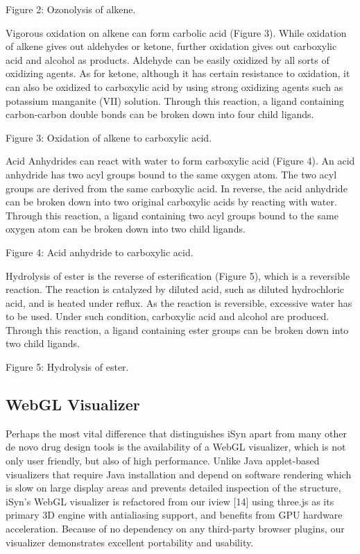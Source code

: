 Figure 2: Ozonolysis of alkene.

Vigorous oxidation on alkene can form carbolic acid (Figure 3). While oxidation of alkene gives out aldehydes or ketone, further oxidation gives out carboxylic acid and alcohol as products. Aldehyde can be easily oxidized by all sorts of oxidizing agents. As for ketone, although it has certain resistance to oxidation, it can also be oxidized to carboxylic acid by using strong oxidizing agents such as potassium manganite (VII) solution. Through this reaction, a ligand containing carbon-carbon double bonds can be broken down into four child ligands.
 
Figure 3: Oxidation of alkene to carboxylic acid.

Acid Anhydrides can react with water to form carboxylic acid (Figure 4). An acid anhydride has two acyl groups bound to the same oxygen atom. The two acyl groups are derived from the same carboxylic acid. In reverse, the acid anhydride can be broken down into two original carboxylic acids by reacting with water. Through this reaction, a ligand containing two acyl groups bound to the same oxygen atom can be broken down into two child ligands.
 
Figure 4: Acid anhydride to carboxylic acid.

Hydrolysis of ester is the reverse of esterification (Figure 5), which is a reversible reaction. The reaction is catalyzed by diluted acid, such as diluted hydrochloric acid, and is heated under reflux. As the reaction is reversible, excessive water has to be used. Under such condition, carboxylic acid and alcohol are produced. Through this reaction, a ligand containing ester groups can be broken down into two child ligands.

Figure 5: Hydrolysis of ester.

\subsection{WebGL Visualizer}

Perhaps the most vital difference that distinguishes iSyn apart from many other de novo drug design tools is the availability of a WebGL visualizer, which is not only user friendly, but also of high performance. Unlike Java applet-based visualizers that require Java installation and depend on software rendering which is slow on large display areas and prevents detailed inspection of the structure, iSyn’s WebGL visualizer is refactored from our iview [14] using three.js as its primary 3D engine with antialiasing support, and benefits from GPU hardware acceleration. Because of no dependency on any third-party browser plugins, our visualizer demonstrates excellent portability and usability.

